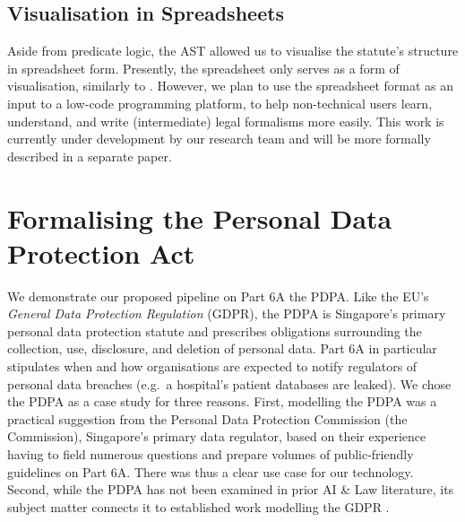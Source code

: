 \documentclass{IOS-Book-Article}
\begin{document}
\subsection{Visualisation in Spreadsheets}

Aside from predicate logic, the AST allowed us to visualise the statute's structure in spreadsheet form.
Presently, the spreadsheet only serves as a form of visualisation, similarly to \cite{mochales_study_2008}.
However, we plan to use the spreadsheet format as an input to a low-code programming platform,
to help non-technical users learn, understand, and write (intermediate) legal formalisms more easily.
This work is currently under development by our research team and will be more formally described in a separate paper.



\section{Formalising the Personal Data Protection Act}
\label{sec:pdpa}

We demonstrate our proposed pipeline on Part 6A the PDPA. Like the EU's \textit{General Data Protection Regulation} (GDPR), the PDPA is Singapore's primary personal data protection statute and prescribes obligations surrounding the collection, use, disclosure, and deletion of personal data. Part 6A in particular stipulates when and how organisations are expected to notify regulators of personal data breaches (e.g.\ a hospital's patient databases are leaked). We chose the PDPA as a case study for three reasons. First, modelling the PDPA was a practical suggestion from the Personal Data Protection Commission (the Commission), Singapore's primary data regulator, based on their experience having to field numerous questions and prepare volumes of public-friendly guidelines on Part 6A. There was thus a clear use case for our technology. Second, while the PDPA has not been examined in prior AI \& Law literature, its subject matter connects it to established work modelling the GDPR \cite{palmirani_modelling_2018, brennan_gdpr_2021, hickey_gdpr_2021}.
\end{document}
